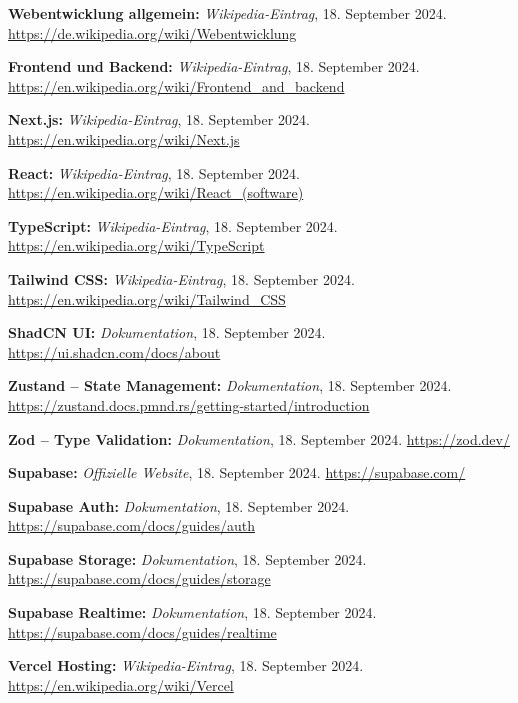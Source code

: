\begin{thebibliography}{9999}

\textbf{Webentwicklung allgemein:} \textit{Wikipedia-Eintrag}, 18. September 2024.  
\url{https://de.wikipedia.org/wiki/Webentwicklung}

\textbf{Frontend und Backend:} \textit{Wikipedia-Eintrag}, 18. September 2024.  
\url{https://en.wikipedia.org/wiki/Frontend_and_backend}

\textbf{Next.js:} \textit{Wikipedia-Eintrag}, 18. September 2024.  
\url{https://en.wikipedia.org/wiki/Next.js}

\textbf{React:} \textit{Wikipedia-Eintrag}, 18. September 2024.  
\url{https://en.wikipedia.org/wiki/React_(software)}

\textbf{TypeScript:} \textit{Wikipedia-Eintrag}, 18. September 2024.  
\url{https://en.wikipedia.org/wiki/TypeScript}

\textbf{Tailwind CSS:} \textit{Wikipedia-Eintrag}, 18. September 2024.  
\url{https://en.wikipedia.org/wiki/Tailwind_CSS}

\textbf{ShadCN UI:} \textit{Dokumentation}, 18. September 2024.  
\url{https://ui.shadcn.com/docs/about}

\textbf{Zustand – State Management:} \textit{Dokumentation}, 18. September 2024.  
\url{https://zustand.docs.pmnd.rs/getting-started/introduction}

\textbf{Zod – Type Validation:} \textit{Dokumentation}, 18. September 2024.  
\url{https://zod.dev/}

\textbf{Supabase:} \textit{Offizielle Website}, 18. September 2024.  
\url{https://supabase.com/}

\textbf{Supabase Auth:} \textit{Dokumentation}, 18. September 2024.  
\url{https://supabase.com/docs/guides/auth}

\textbf{Supabase Storage:} \textit{Dokumentation}, 18. September 2024.  
\url{https://supabase.com/docs/guides/storage}

\textbf{Supabase Realtime:} \textit{Dokumentation}, 18. September 2024.  
\url{https://supabase.com/docs/guides/realtime}

\textbf{Vercel Hosting:} \textit{Wikipedia-Eintrag}, 18. September 2024.  
\url{https://en.wikipedia.org/wiki/Vercel}


\end{thebibliography}
